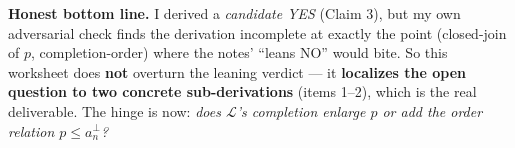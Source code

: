 \documentclass[11pt]{article}
\newcommand{\Lcal}{\mathcal{L}}
\begin{document}
\begin{verify}
\noindent\textbf{Honest bottom line.} I derived a \emph{candidate YES} (Claim
3), but my own adversarial check finds the derivation incomplete at exactly the
point (closed-join of $p$, completion-order) where the notes' ``leans NO''
would bite. So this worksheet does \textbf{not} overturn the leaning verdict ---
it \textbf{localizes the open question to two concrete sub-derivations} (items
1--2), which is the real deliverable. The hinge is now: \emph{does $\Lcal$'s
completion enlarge $p$ or add the order relation $p\le a_n^\perp$?}
\end{verify}
\end{document}
